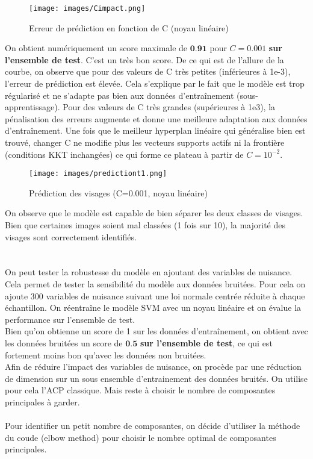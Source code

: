 \documentclass[a4paper, 12pt]{article}
\begin{document}
\begin{figure}[h]
    \centering
    \texttt{[image: images/Cimpact.png]}
    \caption{Erreur de prédiction en fonction de C (noyau linéaire)}
    \label{fig:faceC}
\end{figure}

On obtient numériquement un score maximale de $\textbf{0.91}$ pour $C=0.001$ \textbf{sur l'ensemble de test}. C'est un très bon score.
De ce qui est de l'allure de la courbe, on observe que pour des valeurs de C très petites (inférieures à 1e-3), l'erreur de prédiction est élevée. Cela s'explique par le fait que le modèle est trop régularisé et ne s'adapte pas bien aux données d'entraînement (sous-apprentissage).
Pour des valeurs de C très grandes (supérieures à 1e3), la pénalisation des erreurs augmente et donne une meilleure adaptation aux données d'entraînement. Une fois que le meilleur hyperplan linéaire qui généralise bien est trouvé, changer
C ne modifie plus les vecteurs supports actifs ni la frontière (conditions KKT inchangées) ce qui forme ce plateau à partir de $C=10^{-2}$.


\begin{figure}[h!]
    \centering
    \texttt{[image: images/predictiont1.png]}
    \caption{Prédiction des visages (C=0.001, noyau linéaire)}
    \label{fig:faceC2}
\end{figure}
\newpage
On observe que le modèle est capable de bien séparer les deux classes de visages. Bien que certaines images soient mal classées (1 fois sur 10), la majorité des visages sont correctement identifiés.
\\
\\
\\
On peut tester la robustesse du modèle en ajoutant des variables de nuisance. Cela permet de tester la sensibilité du modèle aux données bruitées.
Pour cela on ajoute 300 variables de nuisance suivant une loi normale centrée réduite à chaque échantillon. On réentraîne le modèle SVM avec un noyau linéaire et on évalue la performance sur l'ensemble de test.
\\
Bien qu'on obtienne un score de 1 sur les données d'entraînement, on obtient avec les données bruitées un score de $\textbf{0.5}$ \textbf{sur l'ensemble de test}, ce qui est fortement moins bon qu'avec les données non bruitées.
\\

Afin de réduire l'impact des variables de nuisance, on procède par une réduction de dimension sur un sous ensemble d'entrainement des données bruités. On utilise pour cela l'ACP classique. Mais reste à choisir le nombre de composantes principales à garder.
\\
\\
Pour identifier un petit nombre de composantes, on décide d'utiliser la méthode du coude (elbow method) pour choisir le nombre optimal de composantes principales.
\end{document}
